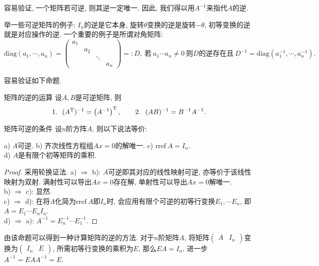 容易验证, 一个矩阵若可逆, 则其逆一定唯一. 因此, 我们得以用$A^{-1}$来指代$A$的逆. 

举一些可逆矩阵的例子: $I_n$的逆是它本身, 旋转$\theta$变换的逆是旋转$-\theta$, 初等变换的逆就是对应操作的逆. 一个重要的例子是所谓对角矩阵: $$\textrm{diag} (a_1, \cdots ,a_n) = \left( \begin{smallmatrix}
	 a_1 &   &   &   \\
	   & a_2 &   &   \\
	   &   &\ddots &   \\
	   &   &   & a_n     
\end{smallmatrix} \right)=:D,~\textit{若}~a_1\cdots a_n \neq 0~\textit{则$D$的逆存在且} ~D^{-1} = \textrm{diag} (a_1^{-1},\cdots ,a_n^{-1}). $$

容易验证如下命题. 

\begin{proposition}{矩阵的逆的运算}
	设$A,B$是可逆矩阵, 则$$1.~~(A^{\operatorname{T}})^{-1} = \left(A^{-1}\right)^{\operatorname{T}} ,\qquad 2.~~(AB)^{-1}=B^{-1}A^{-1}.$$
\end{proposition}

\begin{proposition}{矩阵可逆的条件}
	设$n$阶方阵$A$, 则以下说法等价:
	\begin{center}
		a) $A$可逆. \qquad b) 齐次线性方程组$Ax=0$的解唯一. \qquad c) $\textrm{rref}~ A=I_n$. \\ d) $A$是有限个初等矩阵的乘积. 
	\end{center}
\end{proposition}
\begin{proof}
	采用轮换证法. 
	a) $\Rightarrow $ b): $A$可逆即其对应的线性映射可逆, 亦等价于该线性映射为双射. 满射性可以导出$Ax=0$存在解, 单射性可以导出$Ax=0$解唯一. \\
	b) $\Rightarrow $ c): 显然. \\
	c) $\Rightarrow $ d): 在将$A$化简为$\textrm{rref}~A$即$I_n$时, 会应用有限个可逆的初等行变换$E_1,\cdots E_n$, 即$A=E_1\cdots E_nI_n$. \\
	d) $\Rightarrow $ a): $A^{-1} = E_n^{-1}\cdots E_1^{-1}$. 
\end{proof}

由该命题可以得到一种计算矩阵的逆的方法. 对于$n$阶矩阵$A$, 将矩阵$\begin{pmatrix}
	A & I_n
\end{pmatrix}$变换为$\begin{pmatrix}
	I_n & E
\end{pmatrix}$, 所需初等行变换的乘积为$E$, 那么$EA=I_n$, 进一步$A^{-1} = EAA^{-1}=E$. 

